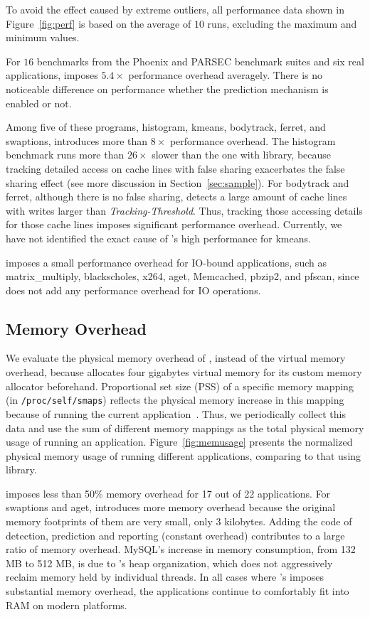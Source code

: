 To avoid the effect caused by extreme outliers, all performance data shown in Figure~\ref{fig:perf} is based on the average of $10$ runs, excluding the maximum and minimum values. 

For $16$ benchmarks from the Phoenix and PARSEC benchmark suites and six real applications, \Predator{} imposes $5.4\times$ performance overhead averagely. There is no noticeable difference on performance whether the prediction mechanism is enabled or not. 
 
Among five of these programs, histogram, kmeans, bodytrack, ferret, and swaptions, \predator{} introduces more than $8\times$ performance overhead. The histogram benchmark runs more than $26\times$ slower than the one with \pthreads{} library, because tracking detailed access on cache lines with false sharing exacerbates the false sharing effect (see more discussion in Section~\ref{sec:sample}).  For bodytrack and ferret, although there is no false sharing, \Predator{} detects a large amount of cache lines with writes larger than {\it Tracking-Threshold}. Thus, tracking those accessing details for those cache lines imposes significant performance overhead. Currently, we have not identified the exact cause of \Predator{}'s high performance for kmeans.
   
\Predator{} imposes a small performance overhead for IO-bound applications, such as matrix\_multiply, blackscholes, x264, aget, Memcached, pbzip2, and pfscan, since \Predator{} does not add any performance overhead for IO operations.  

\subsection{Memory Overhead}
\label{sec:memoverhead}
We evaluate the physical memory overhead of \Predator{}, instead of the virtual memory overhead, because \Predator{} allocates four gigabytes virtual memory for its custom memory allocator beforehand. Proportional set size (PSS) of a specific memory mapping (in \texttt{/proc/self/smaps}) reflects the physical memory increase in this mapping because of running the current application~\cite{memusage}. Thus, we periodically collect this data and use the sum of different memory mappings as the total physical memory usage of running an application. Figure~\ref{fig:memusage} presents the normalized physical memory usage of running different applications, comparing to that using \pthreads{} library. 

\Predator{} imposes less than 50\% memory overhead for 17 out of 22 applications.  For swaptions and aget, \Predator{} introduces more memory overhead because the original memory footprints of them are very small, only $3$ kilobytes. Adding the code of detection, prediction and reporting (constant overhead) contributes to a large ratio of memory overhead. MySQL’s increase in memory consumption, from 132 MB to 512 MB, is due to \Predator{}'s heap organization, which does not aggressively reclaim memory held by individual threads. In all cases where \Predator{}'s imposes substantial memory overhead, the applications continue to comfortably fit into RAM on modern platforms.


